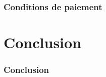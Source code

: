 \documentclass{beamer}
\begin{document}
\begin{frame}\frametitle{Conditions de paiement}

\end{frame}


\section{Conclusion}
\begin{frame}\frametitle{Conclusion}

\end{frame}
\end{document}
